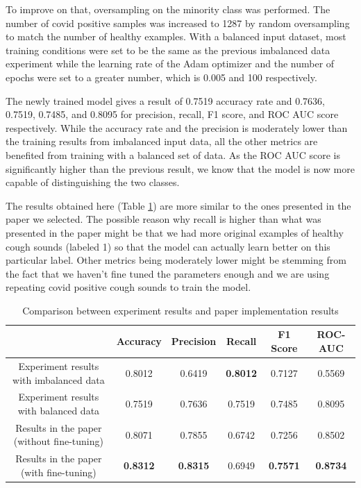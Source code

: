 \documentclass[11pt]{article}
\begin{document}
To improve on that, oversampling on the minority class was performed. The number of covid positive samples was increased to 1287 by random oversampling to match the number of healthy examples. With a balanced input dataset, most training conditions were set to be the same as the previous imbalanced data experiment while the learning rate of the Adam optimizer and the number of epochs were set to a greater number, which is 0.005 and 100 respectively. 

The newly trained model gives a result of 0.7519 accuracy rate and 0.7636, 0.7519, 0.7485, and 0.8095 for precision, recall, F1 score, and ROC AUC score respectively. While the accuracy rate and the precision is moderately lower than the training results from imbalanced input data, all the other metrics are benefited from training with a balanced set of data. As the ROC AUC score is significantly higher than the previous result, we know that the model is now more capable of distinguishing the two classes. 

The results obtained here (Table \ref{tab:cmp_vggish}) are more similar to the ones presented in the paper we selected. The possible reason why recall is higher than what was presented in the paper might be that we had more original examples of healthy cough sounds (labeled 1) so that the model can actually learn better on this particular label. Other metrics being moderately lower might be stemming from the fact that we haven’t fine tuned the parameters enough and we are using repeating covid positive cough sounds to train the model. 

\begin{table}
	\centering
	\begin{tabular}[!htbp]{|c|c|c|c|c|c|}
	\hline
	& Accuracy & Precision & Recall & F1 Score & ROC-AUC\\
	\hline
	Experiment results with imbalanced data & 0.8012 & 0.6419 & \textbf{0.8012} & 0.7127 & 0.5569\\
	\hline
	Experiment results with balanced data & 0.7519 & 0.7636 & 0.7519 & 0.7485 & 0.8095\\
	\hline
	Results in the paper (without fine-tuning) & 0.8071 & 0.7855 & 0.6742 & 0.7256 & 0.8502\\
	\hline
	Results in the paper (with fine-tuning) & \textbf{0.8312} & \textbf{0.8315} & 0.6949 & \textbf{0.7571} & \textbf{0.8734}\\
	\hline
	\end{tabular}
	\caption{Comparison between experiment results and paper implementation results}
	\label{tab:cmp_vggish}
\end{table}
\end{document}
